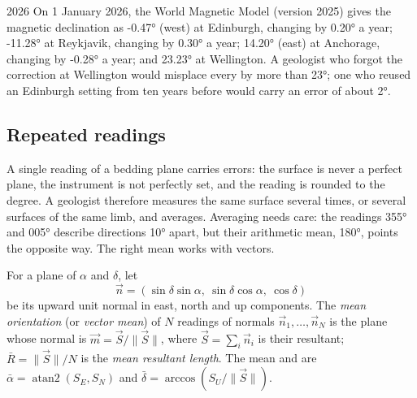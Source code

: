 \begin{dated}{2026}
On 1 January 2026, the World Magnetic Model (version 2025) gives the
magnetic declination as \ang{-0.47} (west) at Edinburgh, changing by
\ang{+0.20} a year; \ang{-11.28} at Reykjavik, changing by \ang{+0.30} a year;
\ang{+14.20} (east) at Anchorage, changing by \ang{-0.28} a year; and
\ang{+23.23} at Wellington. A geologist who forgot the correction at
Wellington would misplace every  by more than \ang{23}; one who reused
an Edinburgh setting from ten years before would carry an error of about
\ang{2}.
\end{dated}

\subsection{Repeated readings}

A single reading of a bedding plane carries errors: the surface is never a
perfect plane, the instrument is not perfectly set, and the reading is rounded
to the degree. A geologist therefore measures the same surface several times,
or several surfaces of the same limb, and averages. Averaging  needs
care: the readings \ang{355} and \ang{005} describe directions \ang{10} apart,
but their arithmetic mean, \ang{180}, points the opposite way. The right mean
works with vectors.

\begin{definition}\label{def:b1:field-lab-methods-1:mean-orientation}
For a plane of  $\alpha$ and  $\delta$, let
\[
  \vec n = (\sin\delta\sin\alpha,\ \sin\delta\cos\alpha,\ \cos\delta)
\]
be its upward unit normal in east, north and up components. The \emph{mean
orientation} (or \emph{vector mean}) of $N$ readings
of normals $\vec n_1, \dots, \vec n_N$ is the plane whose normal is
$\vec m = \vec S/\|\vec S\|$, where $\vec S = \sum_i \vec n_i$ is their
resultant; $\bar R = \|\vec S\|/N$ is the \emph{mean resultant length}. The
mean  and  are $\bar\alpha = \operatorname{atan2}(S_E, S_N)$
and $\bar\delta = \arccos(S_U/\|\vec S\|)$.
\end{definition}

